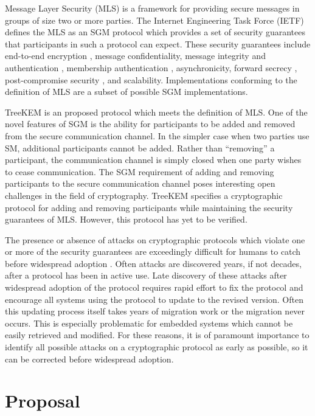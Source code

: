 \documentclass[12pt,twocolumn]{article}
\begin{document}
	Message Layer Security (MLS) \cite{Omara2020} is a framework for providing secure messages in groups of size two or more parties.
	The Internet Engineering Task Force (IETF) defines the MLS as an SGM protocol which provides a set of security guarantees that participants in such a protocol can expect.
	These security guarantees include end-to-end encryption \cite{padlipsky1978limitations}, message confidentiality, message integrity \cite{voydock1983security} and authentication \cite{jueneman1983message}, membership authentication \cite{chaum1985showing}, asynchronicity, forward secrecy \cite{gunther1989identity}, post-compromise security \cite{cohn2016post}, and scalability.
	Implementations conforming to the definition of MLS are a subset of possible SGM implementations.
	
	TreeKEM \cite{bhargavan:hal-02425247} is an proposed protocol which meets the definition of MLS.
	One of the novel features of SGM is the ability for participants to be added and removed from the secure communication channel.
	In the simpler case when two parties use SM, additional participants cannot be added. Rather than ``removing'' a participant, the communication channel is simply closed when one party wishes to cease communication.
	The SGM requirement of adding and removing participants to the secure communication channel poses interesting open challenges in the field of cryptography.
	TreeKEM specifies a cryptographic protocol for adding and removing participants while maintaining the security guarantees of MLS.
	However, this protocol has yet to be verified.
	
	The presence or absence of attacks on cryptographic protocols which violate one or more of the security guarantees are exceedingly difficult for humans to catch before widespread adoption \cite{clark1997survey}.
	Often attacks are discovered years, if not decades, after a protocol has been in active use.
	Late discovery of these attacks after widespread adoption of the protocol requires rapid effort to fix the protocol and encourage all systems using the protocol to update to the revised version.
	Often this updating process itself takes years of migration work or the migration never occurs.
	This is especially problematic for embedded systems which cannot be easily retrieved and modified.
	For these reasons, it is of paramount importance to identify all possible attacks on a cryptographic protocol as early as possible, so it can be corrected before widespread adoption.
	
	
	\section*{Proposal}
	
\end{document}
